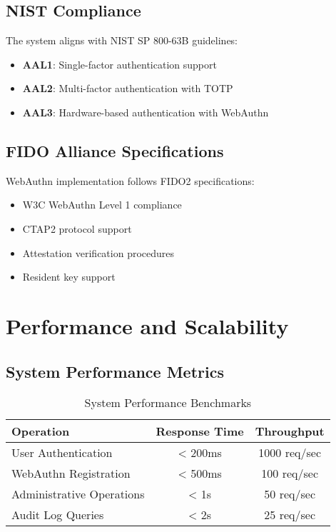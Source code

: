 \documentclass[12pt,a4paper]{article}
\begin{document}
\subsection{NIST Compliance}
The system aligns with NIST SP 800-63B guidelines:

\begin{itemize}
    \item \textbf{AAL1}: Single-factor authentication support
    \item \textbf{AAL2}: Multi-factor authentication with TOTP
    \item \textbf{AAL3}: Hardware-based authentication with WebAuthn
\end{itemize}

\subsection{FIDO Alliance Specifications}
WebAuthn implementation follows FIDO2 specifications:
\begin{itemize}
    \item W3C WebAuthn Level 1 compliance
    \item CTAP2 protocol support
    \item Attestation verification procedures
    \item Resident key support
\end{itemize}

\section{Performance and Scalability}

\subsection{System Performance Metrics}
\begin{table}[H]
\centering
\begin{tabular}{|l|c|c|}
\hline
\textbf{Operation} & \textbf{Response Time} & \textbf{Throughput} \\
\hline
User Authentication & < 200ms & 1000 req/sec \\
\hline
WebAuthn Registration & < 500ms & 100 req/sec \\
\hline
Administrative Operations & < 1s & 50 req/sec \\
\hline
Audit Log Queries & < 2s & 25 req/sec \\
\hline
\end{tabular}
\caption{System Performance Benchmarks}
\label{tab:performance}
\end{table}
\end{document}

